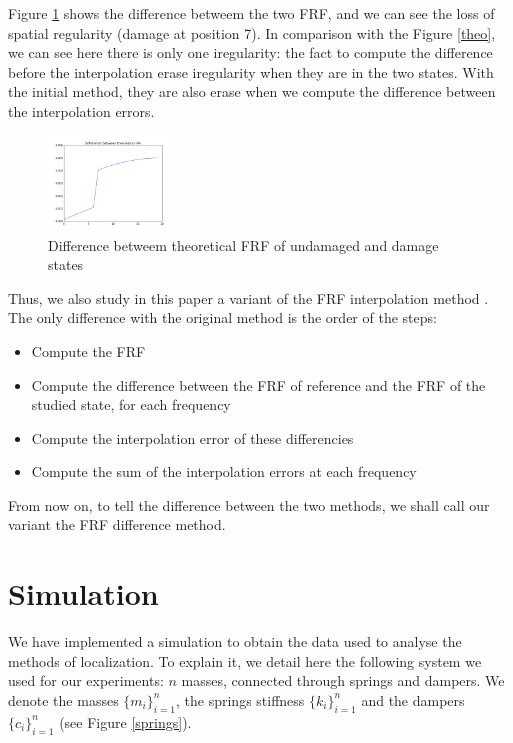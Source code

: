 \documentclass[journal]{IEEEtran}
\begin{document}
Figure \ref{theodiff} shows the difference betweem the two FRF, and we can see the loss of spatial regularity (damage at position 7).
In comparison with the Figure \ref{theo}, we can see here there is only one iregularity: the fact to compute the difference before the interpolation erase iregularity when they are in the two states. With the initial method, they are also erase when we compute the difference between the interpolation errors.

\begin{figure}[h!]
  \centering
  \includegraphics[width=0.3\textwidth]{images/theodiff60.png}
  \caption{Difference betweem theoretical FRF of undamaged and damage states}
  \label{theodiff}
\end{figure}


Thus, we also study in this paper a variant of the FRF interpolation method . The only difference with the original method is the order of the steps:
\begin{itemize}
\item Compute the FRF
\item Compute the difference between the FRF of reference and the FRF of the studied state, for each frequency
\item Compute the interpolation error of these differencies
\item Compute the sum of the interpolation errors at each frequency
\end{itemize}

From now on, to tell the difference between the two methods, we shall call our variant the FRF difference method.



\section{Simulation}


We have implemented a simulation to obtain the data used to analyse the methods of localization. To explain it, we detail here the following system we used for our experiments: $n$ masses, connected
through springs and dampers. We denote the masses $\{m_i\}_{i=1}^n$, the springs stiffness $\{k_i\}_{i=1}^n$ and the dampers $\{c_i\}_{i=1}^n$ (see Figure \ref{springs}).
\end{document}
